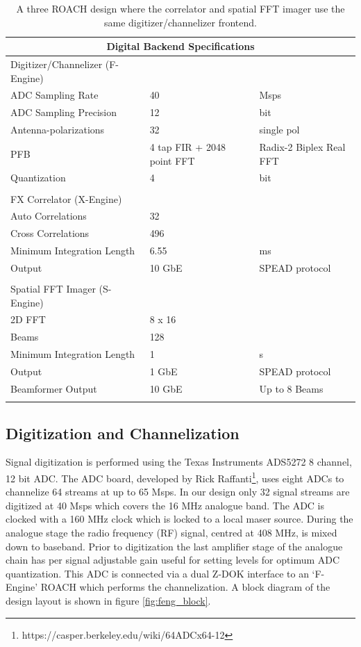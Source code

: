 \documentclass[useAMS,macros,usenatbib]{mn2e}
\begin{document}
\begin{table}
\begin{center}
\begin{tabular}{| l | l | l |}
\hline
\multicolumn{3}{|c|}{Digital Backend Specifications}\\
\hline
Digitizer/Channelizer (F-Engine) & &\\
\hline
ADC Sampling Rate	& 40 			& Msps\\
ADC Sampling Precision	& 12 			& bit \\
Antenna-polarizations 	& 32 			& single pol \\
PFB 			& 4 tap FIR + 2048 point FFT	& Radix-2 Biplex Real FFT\\
Quantization 		& 4 			& bit\\
& & \\
\hline
FX Correlator (X-Engine) & &\\
\hline
Auto Correlations 	& 32 			& \\
Cross Correlations 	& 496 			& \\
Minimum Integration Length & 6.55 		& ms\\
Output 			& 10 GbE 		& SPEAD protocol\\
& & \\
\hline
Spatial FFT Imager (S-Engine) & &\\
\hline
2D FFT 			& 8 x 16 		& \\
Beams 			& 128 			& \\
Minimum Integration Length & 1 			& s\\
Output 			& 1 GbE 		& SPEAD protocol\\
Beamformer Output 	& 10 GbE 		& Up to 8 Beams\\
& & \\
\hline
\end{tabular}
\caption{A three ROACH design where the correlator and spatial FFT imager use the same digitizer/channelizer frontend.}
\label{tbl:digital_specs}
\end{center}
\end{table}

\subsection{Digitization and Channelization}
\label{channelization}

Signal digitization is performed using the Texas Instruments ADS5272 8 channel, 12 bit ADC.
The ADC board, developed by Rick Raffanti\footnote{https://casper.berkeley.edu/wiki/64ADCx64-12}, uses eight ADCs to channelize 64 streams at up to 65 Msps.
In our design only 32 signal streams are digitized at 40 Msps which covers the 16 MHz analogue band.
The ADC is clocked with a 160 MHz clock which is locked to a local maser source.
During the analogue stage the radio frequency (RF) signal, centred at 408 MHz, is mixed down to baseband.
Prior to digitization the last amplifier stage of the analogue chain has per signal adjustable gain useful for setting levels for optimum ADC quantization.
This ADC is connected via a dual Z-DOK interface to an `F-Engine' ROACH which performs the channelization.
A block diagram of the design layout is shown in figure \ref{fig:feng_block}.
\end{document}
